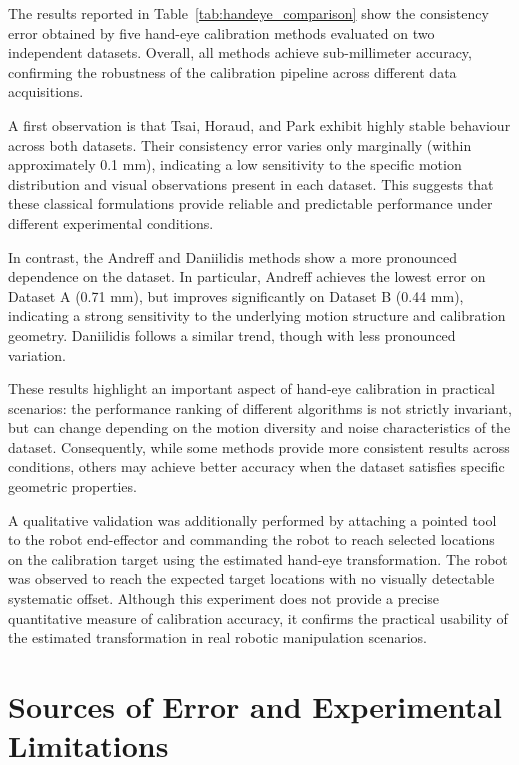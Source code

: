 The results reported in Table~\ref{tab:handeye_comparison} show the consistency error obtained by five hand-eye calibration methods evaluated on two independent datasets. Overall, all methods achieve sub-millimeter accuracy, confirming the robustness of the calibration pipeline across different data acquisitions.

A first observation is that Tsai, Horaud, and Park exhibit highly stable behaviour across both datasets. Their consistency error varies only marginally (within approximately 0.1 mm), indicating a low sensitivity to the specific motion distribution and visual observations present in each dataset. This suggests that these classical formulations provide reliable and predictable performance under different experimental conditions.

In contrast, the Andreff and Daniilidis methods show a more pronounced dependence on the dataset. In particular, Andreff achieves the lowest error on Dataset A (0.71 mm), but improves significantly on Dataset B (0.44 mm), indicating a strong sensitivity to the underlying motion structure and calibration geometry. Daniilidis follows a similar trend, though with less pronounced variation.

These results highlight an important aspect of hand-eye calibration in practical scenarios: the performance ranking of different algorithms is not strictly invariant, but can change depending on the motion diversity and noise characteristics of the dataset. Consequently, while some methods provide more consistent results across conditions, others may achieve better accuracy when the dataset satisfies specific geometric properties.

A qualitative validation was additionally performed by attaching a pointed tool to the robot end-effector and commanding the robot to reach selected locations on the calibration target using the estimated hand-eye transformation. The robot was observed to reach the expected target locations with no visually detectable systematic offset. Although this experiment does not provide a precise quantitative measure of calibration accuracy, it confirms the practical usability of the estimated transformation in real robotic manipulation scenarios.



\section{Sources of Error and Experimental Limitations}
\label{sec:handeye_limitations}

